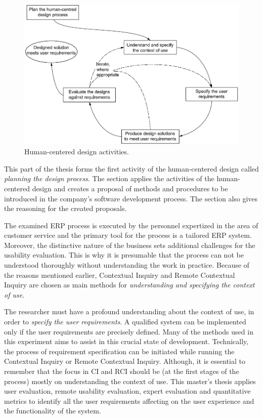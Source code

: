 \documentclass[12pt,a4paper,oneside,pdftex]{report}
\begin{document}
\begin{figure}[H]
  	\centering
    	\includegraphics[width=1.0\textwidth]{./images/hci_process.png}
  	\caption{Human-centered design activities.\cite{RefWorks:16}}
	\label{fig:hci_process}
\end{figure}



This part of the thesis forms the first activity of the human-centered design called \emph{planning the design process}. The section applies the activities of the human-centered design and creates a proposal of methods and procedures to be introduced in the company's software development process. The section also gives the reasoning for the created proposals.

The examined ERP process is executed by the personnel expertized in the area of customer service and the primary tool for the process is a tailored ERP system. Moreover, the distinctive nature of the business sets additional challenges for the usability evaluation. This is why it is presumable that the process can not be understood thoroughly without understanding the work in practice. Because of the reasons mentioned earlier, Contextual Inquiry and Remote Contextual Inquiry are chosen as main methods for \emph{understanding and specifying the context of use}.

The researcher must have a profound understanding about the context of use, in order to \emph{specify the user requirements}. A qualified system can be implemented only if the user requirements are precisely defined. Many of the methods used in this experiment aims to assist in this crucial state of development. Technically, the process of requirement specification can be initiated while running the Contextual Inquiry or Remote Contextual Inquiry. Although, it is essential to remember that the focus in CI and RCI should be (at the first stages of the process) mostly on understanding the context of use. This master's thesis applies user evaluation, remote usability evaluation, expert evaluation and quantitative metrics to identify all the user requirements affecting on the user experience and the functionality of the system. 
\end{document}
